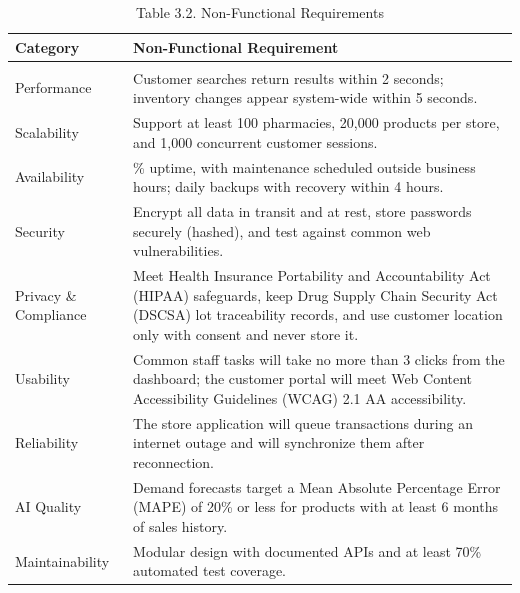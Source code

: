 {\def\LTcaptype{none} %
\begin{longtable}[]{|
  >{\raggedright\arraybackslash}m{}|
  >{\raggedright\arraybackslash}m{}|}
\hline
\begin{minipage}[c]{\linewidth}\raggedright
\textbf{Category}
\end{minipage} & \begin{minipage}[c]{\linewidth}\centering
\textbf{Non-Functional Requirement}
\end{minipage} \\
\hline
\endhead

\caption*{Table 3.2. Non-Functional Requirements}\\
\endlastfoot
Performance & Customer searches return results within 2 seconds; inventory changes appear system-wide within 5 seconds. \\ \hline
Scalability & Support at least 100 pharmacies, 20,000 products per store, and 1,000 concurrent customer sessions. \\ \hline
Availability & 99.5\% uptime, with maintenance scheduled outside business hours; daily backups with recovery within 4 hours. \\ \hline
Security & Encrypt all data in transit and at rest, store passwords securely (hashed), and test against common web vulnerabilities. \\ \hline
Privacy \& Compliance & Meet Health Insurance Portability and Accountability Act (HIPAA) safeguards, keep Drug Supply Chain Security Act (DSCSA) lot traceability records, and use customer location only with consent and never store it. \\ \hline
Usability & Common staff tasks will take no more than 3 clicks from the dashboard; the customer portal will meet Web Content Accessibility Guidelines (WCAG) 2.1 AA accessibility. \\ \hline
Reliability & The store application will queue transactions during an internet outage and will synchronize them after reconnection. \\ \hline
AI Quality & Demand forecasts target a Mean Absolute Percentage Error (MAPE) of 20\% or less for products with at least 6 months of sales history. \\ \hline
Maintainability & Modular design with documented APIs and at least 70\% automated test coverage. \\ \hline
\end{longtable}
}

